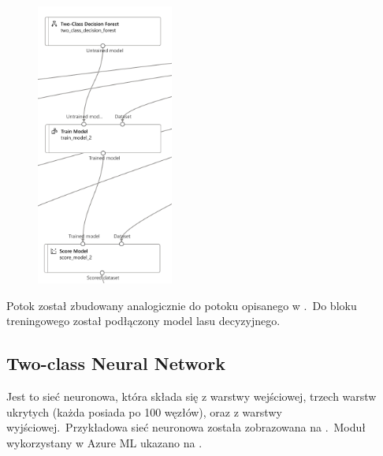 \begin{figure}[H]
    \centering
    \includegraphics[width=0.4\textwidth]{images/df_pipe}
    \label{fig:df-pipe}
\end{figure}

Potok został zbudowany analogicznie do potoku opisanego w .\ Do bloku treningowego został podłączony model lasu decyzyjnego.

\subsection{Two-class Neural Network}
Jest to sieć neuronowa, która składa się z warstwy wejściowej, trzech warstw ukrytych (każda posiada po 100 węzłów), oraz z warstwy wyjściowej.\ Przykładowa sieć neuronowa została zobrazowana na .\ Moduł wykorzystany w Azure ML ukazano na .

